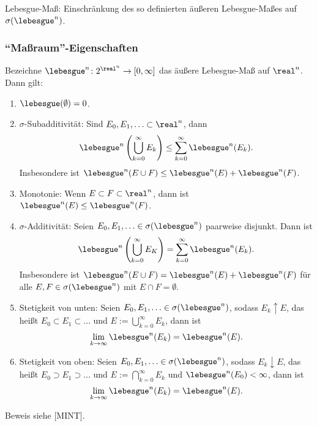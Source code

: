  Lebesgue-Maß: Einschränkung des so definierten äußeren Lebesgue-Maßes auf $\sigma( \lebesgue^n )$.
 
\subsubsection{``Maßraum''-Eigenschaften}
\begin{thm}
 Bezeichne $\lebesgue^n\colon 2^{\real^n} \to [0, \infty]$ das äußere Lebesgue-Maß auf $\real^n$. Dann gilt:
 \begin{enumerate}
  \item $\lebesgue( \emptyset ) = 0$.
  \item $\sigma$-Subadditivität: Sind $E_0, E_1, \ldots \subset \real^n$, dann
   \[ \lebesgue^n \left( \bigcup_{k=0}^\infty E_k \right) \le \sum_{k=0}^\infty \lebesgue^n (E_k). \]
   Insbesondere ist $\lebesgue^n (E \cup F) \le \lebesgue^n (E) + \lebesgue^n (F)$.
  \item Monotonie: Wenn $E \subset F \subset \real^n$, dann ist $\lebesgue^n (E) \le \lebesgue^n (F)$.
  \item $\sigma$-Additivität: Seien $E_0, E_1, \ldots \in \sigma(\lebesgue^n)$ paarweise disjunkt. Dann ist
   \[ \lebesgue^n \left( \bigcup_{k=0}^\infty E_K \right) = \sum_{k=0}^\infty \lebesgue^n (E_k). \]
   Insbesondere ist $\lebesgue^n (E \cup F) = \lebesgue^n (E) + \lebesgue^n (F)$ für alle $E,F \in \sigma(\lebesgue^n)$ mit $E \cap F = \emptyset$.
  \item Stetigkeit von unten: Seien $E_0, E_1, \ldots \in \sigma(\lebesgue^n)$, sodass $E_k \uparrow E$, das heißt $E_0 \subset E_1 \subset \ldots$ und $E := \bigcup_{k=0}^\infty E_k$, dann ist
   \[ \lim_{k \to \infty} \lebesgue^n(E_k) =  \lebesgue^n (E). \]
  \item Stetigkeit von oben: Seien $E_0, E_1, \ldots \in \sigma(\lebesgue^n)$, sodass $E_k \downarrow E$, das heißt $E_0 \supset E_1 \supset \ldots$ und $E := \bigcap_{k=0}^\infty E_k$ und $\lebesgue^n(E_0) < \infty$, dann ist
   \[ \lim_{k \to \infty} \lebesgue^n(E_k) =  \lebesgue^n (E). \]
 \end{enumerate}
\end{thm}

Beweis siehe [MINT].

